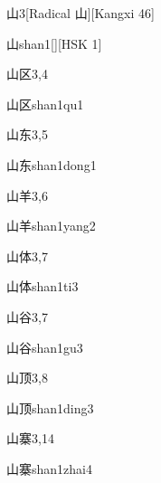 \begin{entry}{山}{3}[Radical 山][Kangxi 46]
  \begin{phonetics}{山}{shan1}[][HSK 1]
  \end{phonetics}
\end{entry}

\begin{entry}{山区}{3,4}
  \begin{phonetics}{山区}{shan1qu1}
  \end{phonetics}
\end{entry}

\begin{entry}{山东}{3,5}
  \begin{phonetics}{山东}{shan1dong1}
  \end{phonetics}
\end{entry}

\begin{entry}{山羊}{3,6}
  \begin{phonetics}{山羊}{shan1yang2}
  \end{phonetics}
\end{entry}

\begin{entry}{山体}{3,7}
  \begin{phonetics}{山体}{shan1ti3}
  \end{phonetics}
\end{entry}

\begin{entry}{山谷}{3,7}
  \begin{phonetics}{山谷}{shan1gu3}
  \end{phonetics}
\end{entry}

\begin{entry}{山顶}{3,8}
  \begin{phonetics}{山顶}{shan1ding3}
  \end{phonetics}
\end{entry}

\begin{entry}{山寨}{3,14}
  \begin{phonetics}{山寨}{shan1zhai4}
  \end{phonetics}
\end{entry}


